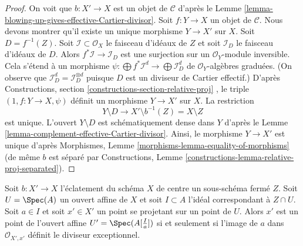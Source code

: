 \begin{proof}
On voit que  $b : X' \to X$  est un objet de  $\mathcal{C}$  d'après le Lemme  \ref{lemma-blowing-up-gives-effective-Cartier-divisor}.
Soit  $f : Y \to X$  un objet de  $\mathcal{C}$. Nous devons montrer qu'il existe un
unique morphisme  $Y \to X'$  sur  $X$. Soit  $D = f^{-1}(Z)$. Soit
 $\mathcal{I} \subset \mathcal{O}_X$  le faisceau d'idéaux de  $Z$  et soit  $\mathcal{I}_D$  le faisceau
d'idéaux de  $D$. Alors  $f^*\mathcal{I} \to \mathcal{I}_D$  est une surjection sur un
 $\mathcal{O}_Y$-module inversible. Cela s'étend à un morphisme  $\psi : \bigoplus f^*\mathcal{I}^d \to \bigoplus \mathcal{I}_D^d$  de
 $\mathcal{O}_Y$-algèbres graduées. (On observe que  $\mathcal{I}_D^d = \mathcal{I}_D^{\otimes d}$  puisque  $D$  est un
diviseur de Cartier effectif.) D'après Constructions, section
 \ref{constructions-section-relative-proj} , le triple  $(1, f : Y \to X, \psi)$  définit un morphisme  $Y \to X'$  sur
 $X$. La restriction
$$
Y \setminus D \longrightarrow X' \setminus b^{-1}(Z) = X \setminus Z
$$
est unique. L'ouvert  $Y \setminus D$  est schématiquement dense dans  $Y$ 
d'après le Lemme  \ref{lemma-complement-effective-Cartier-divisor}. Ainsi, le morphisme  $Y \to X'$  est unique d'après
Morphismes, Lemme  \ref{morphisms-lemma-equality-of-morphisms}  (de même  $b$  est séparé par Constructions,
Lemme  \ref{constructions-lemma-relative-proj-separated}).
\end{proof}

\begin{lemma}
\label{lemma-characterize-affine-blowup}
Soit  $b : X' \to X$  l'éclatement du schéma  $X$  de centre un sous-schéma fermé
 $Z$. Soit  $U = \Spec(A)$  un ouvert affine de  $X$  et soit
 $I \subset A$  l'idéal correspondant à  $Z \cap U$. Soit  $a \in I$  et soit
 $x' \in X'$  un point se projetant sur un point de  $U$. Alors
 $x'$  est un point de l'ouvert affine  $U' = \Spec(A[\frac{I}{a}])$  si et seulement si
l'image de  $a$  dans  $\mathcal{O}_{X', x'}$  définit le diviseur exceptionnel.
\end{lemma}

